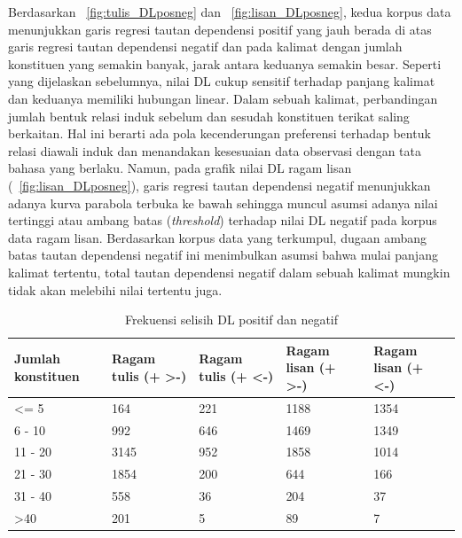 Berdasarkan \pic~\ref{fig:tulis_DLposneg} dan \pic~\ref{fig:lisan_DLposneg}, kedua korpus data menunjukkan garis regresi tautan dependensi positif yang jauh berada di atas garis regresi tautan dependensi negatif dan pada kalimat dengan jumlah konstituen yang semakin banyak, jarak antara keduanya semakin besar. Seperti yang dijelaskan sebelumnya, nilai DL cukup sensitif terhadap panjang kalimat dan keduanya memiliki hubungan linear. Dalam sebuah kalimat, perbandingan jumlah bentuk relasi induk sebelum dan sesudah konstituen terikat saling berkaitan. Hal ini berarti ada pola kecenderungan preferensi terhadap bentuk relasi diawali induk dan menandakan kesesuaian data observasi dengan tata bahasa yang berlaku. Namun, pada grafik nilai DL ragam lisan (\pic~\ref{fig:lisan_DLposneg}), garis regresi tautan dependensi negatif menunjukkan adanya kurva parabola terbuka ke bawah sehingga muncul asumsi adanya nilai tertinggi atau ambang batas (\textit{threshold}) terhadap nilai DL negatif pada korpus data ragam lisan. Berdasarkan korpus data yang terkumpul, dugaan ambang batas tautan dependensi negatif ini menimbulkan asumsi bahwa mulai panjang kalimat tertentu, total tautan dependensi negatif dalam sebuah kalimat mungkin tidak akan melebihi nilai tertentu juga. 

\begin{table}
\begin{center}
\begin{small}
\caption{Frekuensi selisih DL positif dan negatif}  \label{tab:DLposneg}
\begin{tabular}{ | p{2cm} | p{2cm} | p{2cm} | p{2cm} | p{2cm} |}
\hline
Jumlah konstituen & Ragam tulis (+ \textgreater -) & Ragam tulis (+ \textless -) & Ragam lisan (+ \textgreater -) & Ragam lisan (+ \textless -) \\ \hline
\textless= 5 & 164 & 221 & 1188 & 1354 \\ \hline
6 - 10 & 992 & 646 &1469 & 1349 \\ \hline
11 - 20 & 3145 & 952 & 1858 & 1014 \\ \hline
21 - 30 & 1854 & 200 & 644 & 166 \\ \hline
31 - 40 & 558 & 36 & 204 & 37 \\ \hline
\textgreater 40 & 201 & 5 & 89 & 7 \\ \hline
 \end{tabular}
 \end{small}
 \end{center}
 \end{table}
 

